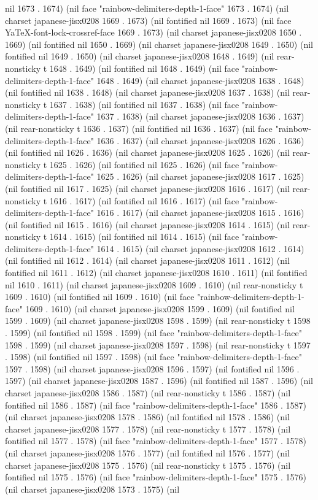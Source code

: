 nil 1673 . 1674) (nil face "rainbow-delimiters-depth-1-face" 1673 . 1674) (nil charset japanese-jisx0208 1669 . 1673) (nil fontified nil 1669 . 1673) (nil face YaTeX-font-lock-crossref-face 1669 . 1673) (nil charset japanese-jisx0208 1650 . 1669) (nil fontified nil 1650 . 1669) (nil charset japanese-jisx0208 1649 . 1650) (nil fontified nil 1649 . 1650) (nil charset japanese-jisx0208 1648 . 1649) (nil rear-nonsticky t 1648 . 1649) (nil fontified nil 1648 . 1649) (nil face "rainbow-delimiters-depth-1-face" 1648 . 1649) (nil charset japanese-jisx0208 1638 . 1648) (nil fontified nil 1638 . 1648) (nil charset japanese-jisx0208 1637 . 1638) (nil rear-nonsticky t 1637 . 1638) (nil fontified nil 1637 . 1638) (nil face "rainbow-delimiters-depth-1-face" 1637 . 1638) (nil charset japanese-jisx0208 1636 . 1637) (nil rear-nonsticky t 1636 . 1637) (nil fontified nil 1636 . 1637) (nil face "rainbow-delimiters-depth-1-face" 1636 . 1637) (nil charset japanese-jisx0208 1626 . 1636) (nil fontified nil 1626 . 1636) (nil charset japanese-jisx0208 1625 . 1626) (nil rear-nonsticky t 1625 . 1626) (nil fontified nil 1625 . 1626) (nil face "rainbow-delimiters-depth-1-face" 1625 . 1626) (nil charset japanese-jisx0208 1617 . 1625) (nil fontified nil 1617 . 1625) (nil charset japanese-jisx0208 1616 . 1617) (nil rear-nonsticky t 1616 . 1617) (nil fontified nil 1616 . 1617) (nil face "rainbow-delimiters-depth-1-face" 1616 . 1617) (nil charset japanese-jisx0208 1615 . 1616) (nil fontified nil 1615 . 1616) (nil charset japanese-jisx0208 1614 . 1615) (nil rear-nonsticky t 1614 . 1615) (nil fontified nil 1614 . 1615) (nil face "rainbow-delimiters-depth-1-face" 1614 . 1615) (nil charset japanese-jisx0208 1612 . 1614) (nil fontified nil 1612 . 1614) (nil charset japanese-jisx0208 1611 . 1612) (nil fontified nil 1611 . 1612) (nil charset japanese-jisx0208 1610 . 1611) (nil fontified nil 1610 . 1611) (nil charset japanese-jisx0208 1609 . 1610) (nil rear-nonsticky t 1609 . 1610) (nil fontified nil 1609 . 1610) (nil face "rainbow-delimiters-depth-1-face" 1609 . 1610) (nil charset japanese-jisx0208 1599 . 1609) (nil fontified nil 1599 . 1609) (nil charset japanese-jisx0208 1598 . 1599) (nil rear-nonsticky t 1598 . 1599) (nil fontified nil 1598 . 1599) (nil face "rainbow-delimiters-depth-1-face" 1598 . 1599) (nil charset japanese-jisx0208 1597 . 1598) (nil rear-nonsticky t 1597 . 1598) (nil fontified nil 1597 . 1598) (nil face "rainbow-delimiters-depth-1-face" 1597 . 1598) (nil charset japanese-jisx0208 1596 . 1597) (nil fontified nil 1596 . 1597) (nil charset japanese-jisx0208 1587 . 1596) (nil fontified nil 1587 . 1596) (nil charset japanese-jisx0208 1586 . 1587) (nil rear-nonsticky t 1586 . 1587) (nil fontified nil 1586 . 1587) (nil face "rainbow-delimiters-depth-1-face" 1586 . 1587) (nil charset japanese-jisx0208 1578 . 1586) (nil fontified nil 1578 . 1586) (nil charset japanese-jisx0208 1577 . 1578) (nil rear-nonsticky t 1577 . 1578) (nil fontified nil 1577 . 1578) (nil face "rainbow-delimiters-depth-1-face" 1577 . 1578) (nil charset japanese-jisx0208 1576 . 1577) (nil fontified nil 1576 . 1577) (nil charset japanese-jisx0208 1575 . 1576) (nil rear-nonsticky t 1575 . 1576) (nil fontified nil 1575 . 1576) (nil face "rainbow-delimiters-depth-1-face" 1575 . 1576) (nil charset japanese-jisx0208 1573 . 1575) (nil 